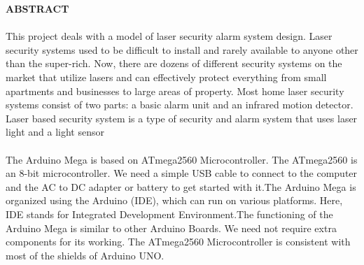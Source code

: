 \begin{center}
\thispagestyle{empty}
\vspace{2cm}
\LARGE{\textbf{ABSTRACT}}\\[1.0cm]
\end{center}
\thispagestyle{empty}
\large{\paragraph{}This project deals with a model of laser security alarm system design. 
Laser security systems used to be difficult to install and rarely available to anyone other than the super-rich. Now, there are dozens of different security systems on the market that utilize lasers and can effectively protect everything from small apartments and businesses to large areas of property. Most home laser security systems consist of two parts: a basic alarm unit and an infrared motion detector. Laser based security system is a type of security and alarm system that uses laser light and a light sensor}
\large{\paragraph{}The Arduino Mega is based on ATmega2560 Microcontroller. The ATmega2560 is an 8-bit microcontroller. We need a simple USB cable to connect to the computer and the AC to DC adapter or battery to get started with it.The Arduino Mega is organized using the Arduino (IDE), which can run on various platforms. Here, IDE stands for Integrated Development Environment.The functioning of the Arduino Mega is similar to other Arduino Boards. We need not require extra components for its working.
The ATmega2560 Microcontroller is consistent with most of the shields of Arduino UNO.}\\
